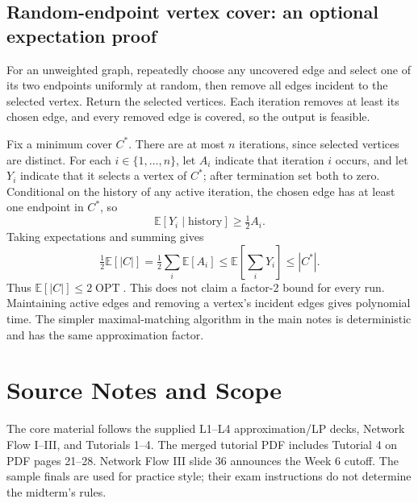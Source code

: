 \documentclass[10pt]{article}
\theoremstyle{definition}
\newcommand{\OPT}{\operatorname{OPT}}
\begin{document}
\subsection{Random-endpoint vertex cover: an optional expectation proof}
\label{app:randomvc}
For an unweighted graph, repeatedly choose any uncovered edge and select one of its two
endpoints uniformly at random, then remove all edges incident to the selected vertex.
Return the selected vertices. Each iteration removes at least its chosen edge, and every
removed edge is covered, so the output is feasible.

Fix a minimum cover $C^*$. There are at most $n$ iterations, since selected vertices are
distinct. For each $i\in\{1,\ldots,n\}$, let $A_i$ indicate that iteration $i$ occurs,
and let $Y_i$ indicate that it selects a vertex of $C^*$; after termination set both to zero.
Conditional on the history of any active iteration, the chosen edge has at least one
endpoint in $C^*$, so
\[
\mathbb E[Y_i\mid\text{history}]\ge\tfrac12 A_i.
\]
Taking expectations and summing gives
\[
\tfrac12\mathbb E[|C|]=\tfrac12\sum_i\mathbb E[A_i]
\le\mathbb E\!\left[\sum_iY_i\right]\le |C^*|.
\]
Thus $\mathbb E[|C|]\le2\OPT$. This does not claim a factor-2 bound for every run.
Maintaining active edges and removing a vertex's incident edges gives polynomial time.
The simpler maximal-matching algorithm in the main notes is deterministic and has the
same approximation factor.

\section{Source Notes and Scope}
\label{app:sources}
The core material follows the supplied L1--L4 approximation/LP decks, Network Flow I--III,
and Tutorials 1--4. The merged tutorial PDF includes Tutorial 4 on PDF pages 21--28.
Network Flow III slide 36 announces the Week 6 cutoff. The sample finals are used for
practice style; their exam instructions do not determine the midterm's rules.
\end{document}
